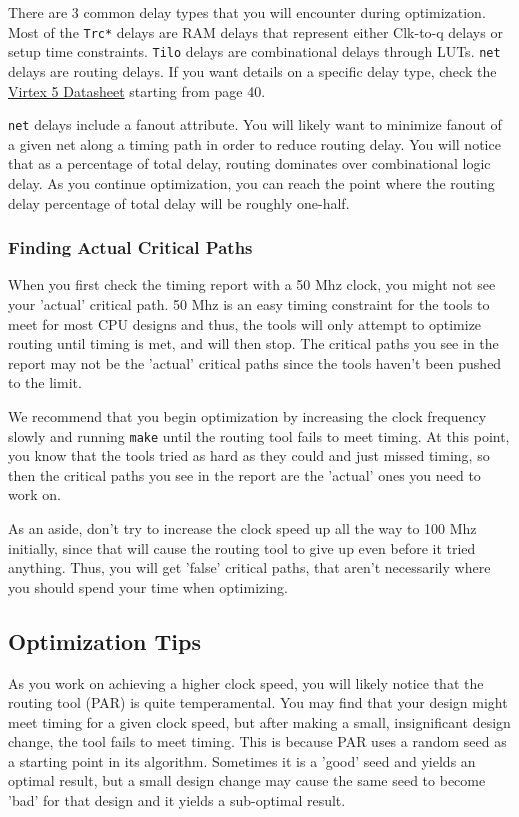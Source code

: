 \documentclass[11pt]{article}
\begin{document}
There are 3 common delay types that you will encounter during optimization. Most of the \verb|Trc*| delays are RAM delays that represent either Clk-to-q delays or setup time constraints. \verb|Tilo| delays are combinational delays through LUTs. \verb|net| delays are routing delays. If you want details on a specific delay type, check the \href{https://www.xilinx.com/support/documentation/data_sheets/ds202.pdf}{Virtex 5 Datasheet} starting from page 40.

\verb|net| delays include a fanout attribute. You will likely want to minimize fanout of a given net along a timing path in order to reduce routing delay. You will notice that as a percentage of total delay, routing dominates over combinational logic delay. As you continue optimization, you can reach the point where the routing delay percentage of total delay will be roughly one-half.

\subsubsection{Finding Actual Critical Paths}
When you first check the timing report with a 50 Mhz clock, you might not see your 'actual' critical path. 50 Mhz is an easy timing constraint for the tools to meet for most CPU designs and thus, the tools will only attempt to optimize routing until timing is met, and will then stop. The critical paths you see in the report may not be the 'actual' critical paths since the tools haven't been pushed to the limit.

We recommend that you begin optimization by increasing the clock frequency slowly and running \verb|make| until the routing tool fails to meet timing. At this point, you know that the tools tried as hard as they could and just missed timing, so then the critical paths you see in the report are the 'actual' ones you need to work on.

As an aside, don't try to increase the clock speed up all the way to 100 Mhz initially, since that will cause the routing tool to give up even before it tried anything. Thus, you will get 'false' critical paths, that aren't necessarily where you should spend your time when optimizing.

\subsection{Optimization Tips}
As you work on achieving a higher clock speed, you will likely notice that the routing tool (PAR) is quite temperamental. You may find that your design might meet timing for a given clock speed, but after making a small, insignificant design change, the tool fails to meet timing. This is because PAR uses a random seed as a starting point in its algorithm. Sometimes it is a 'good' seed and yields an optimal result, but a small design change may cause the same seed to become 'bad' for that design and it yields a sub-optimal result.
\end{document}
